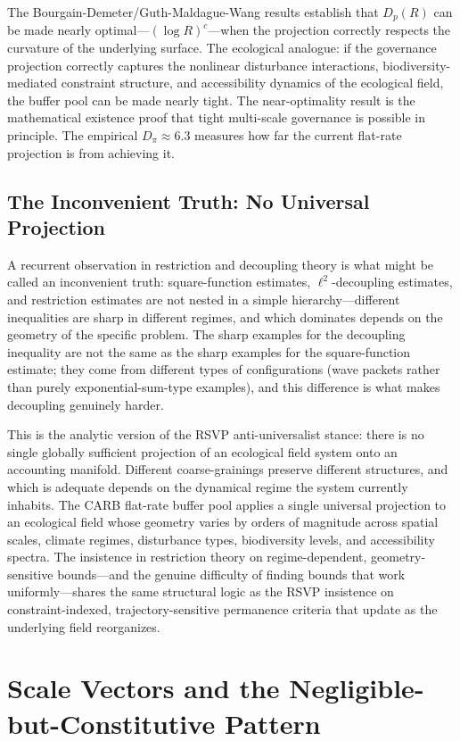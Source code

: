 \documentclass[12pt]{article}
\begin{document}
The Bourgain-Demeter/Guth-Maldague-Wang results establish that $D_p(R)$ can be made
nearly optimal---$(\log R)^c$---when the projection correctly respects the curvature
of the underlying surface. The ecological analogue: if the governance projection
correctly captures the nonlinear disturbance interactions, biodiversity-mediated
constraint structure, and accessibility dynamics of the ecological field, the buffer
pool can be made nearly tight. The near-optimality result is the mathematical existence
proof that tight multi-scale governance is possible in principle. The empirical
$D_\pi\approx 6.3$ measures how far the current flat-rate projection is from achieving it.

\subsection{The Inconvenient Truth: No Universal Projection}

A recurrent observation in restriction and decoupling theory is what might be called an
inconvenient truth: square-function estimates, $\ell^2$-decoupling estimates, and
restriction estimates are not nested in a simple hierarchy---different inequalities are
sharp in different regimes, and which dominates depends on the geometry of the
specific problem. The sharp examples for the decoupling inequality are not the same
as the sharp examples for the square-function estimate; they come from different types
of configurations (wave packets rather than purely exponential-sum-type examples),
and this difference is what makes decoupling genuinely harder.

This is the analytic version of the RSVP anti-universalist stance: there is no single
globally sufficient projection of an ecological field system onto an accounting manifold.
Different coarse-grainings preserve different structures, and which is adequate depends
on the dynamical regime the system currently inhabits. The CARB flat-rate buffer pool
applies a single universal projection to an ecological field whose geometry varies by
orders of magnitude across spatial scales, climate regimes, disturbance types, biodiversity
levels, and accessibility spectra. The insistence in restriction theory on
regime-dependent, geometry-sensitive bounds---and the genuine difficulty of finding
bounds that work uniformly---shares the same structural logic as the RSVP insistence on
constraint-indexed, trajectory-sensitive permanence criteria that update as the
underlying field reorganizes.

\section{Scale Vectors and the Negligible-but-Constitutive Pattern}
\label{sec:scalevectors}
\end{document}
